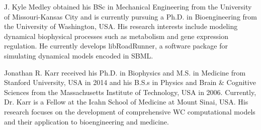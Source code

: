 \documentclass[journal,transmag,twoside]{IEEEtran}
\begin{document}



\begin{IEEEbiography}{J. Kyle Medley}
obtained his BSc in Mechanical Engineering from the University of Missouri-Kansas City and
is currently pursuing a Ph.D. in Bioengineering from the University of Washington, USA.
His research interests include modeling dynamical biophysical processes such as
metabolism and gene expression regulation.
He currently develops libRoadRunner, a software package for simulating dynamical models encoded in SBML.
\end{IEEEbiography}

\begin{IEEEbiography}{Jonathan R. Karr}
received his Ph.D. in Biophysics and M.S. in Medicine from Stanford University, USA in 2014 and his B.S.s in Physics and Brain \& Cognitive Sciences from the Massachusetts Institute of Technology, USA in 2006. Currently, Dr. Karr is a Fellow at the Icahn School of Medicine at Mount Sinai, USA. His research focuses on the development of comprehensive WC computational models and their application to bioengineering and medicine.
\end{IEEEbiography}

\vfill
\end{document}
